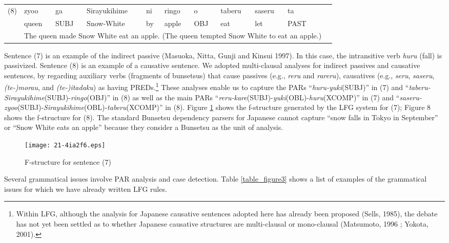 \documentclass[english]{jnlp_1.4_rep}
\begin{document}
\noindent
\begin{tabular}{ll@{ }l@{ }l@{ }l@{ }l@{ }l@{ }l@{ }l@{ }l@{ }l@{ }l}
(8) & zyoo&ga&Sirayukihime&ni&ringo&o&taberu&saseru&ta\\
    & queen&SUBJ&Snow-White&by&apple&OBJ&eat&let&PAST  \\
    & \multicolumn{10}{p{380pt}}{\quad The queen made Snow White eat an apple. (The queen tempted Snow White to eat an apple.)}\\
\end{tabular}

Sentence (7) is an example of the indirect passive (Masuoka, Nitta, Gunji and Kinsui 
1997).  In this case, the intransitive verb \textit{huru} (fall) is
passivized.  Sentence (8) is an example of a causative sentence.  We
adopted multi-clausal analyses for indirect passives and causative
sentences, by regarding auxiliary verbs (fragments of bunsetsus) that
cause passives (e.g., \textit{reru} and \textit{rareru}), causatives
(e.g., \textit{seru}, \textit{saseru}, \textit{(te-)morau}, and
\textit{(te-)itadaku}) as having PREDs.\footnote{Within LFG, although
  the analysis for Japanese causative sentences adopted here has
  already been proposed (Sells, 1985), the debate has not yet been
  settled as to whether Japanese causative structures are
  multi-clausal or mono-clausal (Matsumoto, 1996 ; Yokota, 2001).}
These analyses enable us to capture the PARs
``\textit{huru-yuki}(SUBJ)'' in (7) and
``\textit{taberu-Sirayukihime}(SUBJ)-\textit{ringo}(OBJ)'' in (8) as
well as the main PARs
``\textit{reru-kare}(SUBJ)-\textit{yuki}(OBL)-\textit{huru}(XCOMP)''
in (7) and
``\textit{saseru-zyoo}(SUBJ)-\textit{Sirayukihime}(OBL)-\textit{taberu}(XCOMP)''
in (8).  Figure \ref{paclic_fig2} shows the f-structure generated by
the LFG system for (7); Figure 8 shows the f-structure for (8). The
standard Bunsetsu dependency parsers for Japanese cannot capture
``snow falls in Tokyo in September'' or ``Snow White eats an apple''
because they consider a Bunsetsu as the unit of analysis.

\begin{figure}[b]
\begin{center}
\texttt{[image: 21-4ia2f6.eps]}
\end{center}
\caption{F-structure for sentence (7)}
\label{paclic_fig2}
\end{figure}

Several grammatical issues involve PAR analysis and case detection.
Table \ref{table_figure3} shows a list of examples of the grammatical
issues for which we have already written LFG rules.
\end{document}
